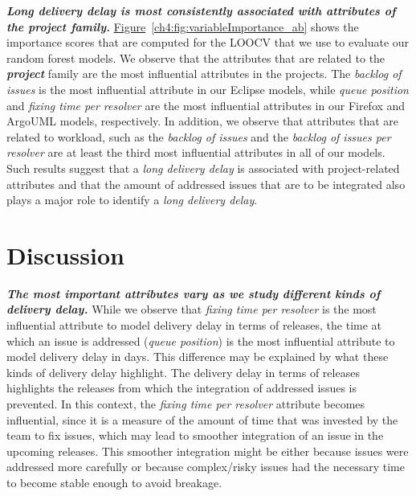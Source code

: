 \noindent\textit{\textbf{Long delivery delay is most consistently associated with
attributes of the project family.}}
\hyperref[ch4:fig:variableImportance_ab]{Figure}~\ref{ch4:fig:variableImportance_ab}
shows the importance scores that are computed for the LOOCV that we use to
evaluate our random forest models. We observe that the attributes that are
related to the \textit{\textbf{project}} family are the most influential
attributes in the projects. The \textit{backlog of issues} is the most
influential attribute in our Eclipse models, while \textit{queue position} and
\textit{fixing time per resolver} are the most influential attributes in our
Firefox and ArgoUML models, respectively. In addition, we observe that
attributes that are related to workload, such as the \textit{backlog of issues}
and the \textit{backlog of issues per resolver} are at least the third most
influential attributes in all of our models. Such results suggest that a
\textit{long delivery delay} is associated with project-related attributes and
that the amount of addressed issues that are to be integrated also plays a major
role to identify a \textit{long delivery delay}. \\


\section{Discussion}\label{ch4:discussion}

\noindent\textbf{\textit{The most important attributes vary as we study
different kinds of delivery delay.}} While we observe that \textit{fixing time
per resolver} is the most influential attribute to model delivery delay in
terms of releases, the time at which an issue is addressed (\textit{queue position})
is the most influential attribute to model delivery delay in days.  This
difference may be explained by what these kinds of delivery delay highlight.
The delivery delay in terms of releases highlights the releases from which the
integration of addressed issues is prevented. In this context, the \textit{fixing
time per resolver} attribute becomes influential, since it is a measure of the
amount of time that was invested by the team to fix issues, which may lead to
smoother integration of an issue in the upcoming releases. This smoother
integration might be either because issues were addressed more carefully or because
complex/risky issues had the necessary time to become stable enough to avoid
breakage. 

